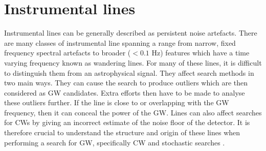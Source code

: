 \section{\label{detchar:lines}Instrumental lines}

%

Instrumental lines can be generally described as persistent noise
artefacts.  There are many classes of
instrumental line spanning a range from narrow, fixed frequency spectral
artefacts to broader ($<0.1$ Hz) features which have a time varying frequency
known as wandering lines.  For many of these lines, it is difficult to
distinguish them from an astrophysical signal.  They affect search methods in
two main ways.  They can cause the search to produce outliers which are then
considered as \gls{GW} candidates.  Extra efforts then have to be made to
analyse these outliers further.  If the line is close to or overlapping with the \gls{GW}
frequency, then it can conceal the power of the \gls{GW}. 
Lines can also affect searches for \glspl{CW} by giving an incorrect estimate of the noise floor of the detector.
It is therefore crucial to understand the structure and origin of these lines when performing a search for
\gls{GW}, specifically \gls{CW} and stochastic searches .

%

